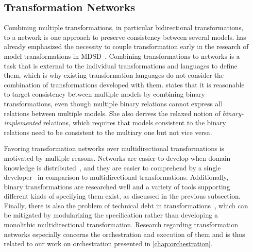 \subsection{Transformation Networks}

Combining multiple transformations, in particular bidirectional transformations, to a network is one approach to preserve consistency between several models.
 has already emphasized the necessity to couple transformation early in the research of model transformations in \gls{MDSD}~\cite{laemmel2004coupledTransformations-WSET}.
Combining transformations to networks is a task that is external to the individual transformations and languages to define them, which is why existing transformation languages do not consider the combination of transformations developed with them.
\textcite{stevens2020BidirectionalTransformationLarge-SoSym} states that it is reasonable to target consistency between multiple models by combining binary transformations, even though multiple binary relations cannot express all relations between multiple models.
She also derives the relaxed notion of \emph{binary-implemented} relations, which requires that models consistent to the binary relations need to be consistent to the multiary one but not vice versa.

Favoring transformation networks over multidirectional transformations is motivated by multiple reasons.
Networks are easier to develop when domain knowledge is distributed~, and they are easier to comprehend by a single developer~\cite{cleve2019dagstuhl, stevens2020BidirectionalTransformationLarge-SoSym} in comparison to multidirectional transformations.
Additionally, binary transformations are researched well and a variety of tools supporting different kinds of specifying them exist, as discussed in the previous subsection.
Finally, there is also the problem of technical debt in transformations~\cite{lano2018technicalDebt-ICMT}, which can be mitigated by modularizing the specification rather than developing a monolithic multidirectional transformation.
Research regarding transformation networks especially concerns the orchestration and execution of them and is thus related to our work on orchestration presented in \autoref{chap:orchestration}.

